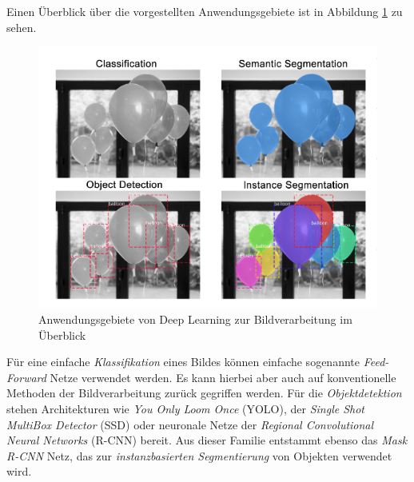 Einen Überblick über die vorgestellten Anwendungsgebiete ist in Abbildung \ref{applications} zu sehen.

\begin{figure}[ht]
	\begin{center}
		\includegraphics[width=12cm]{Bilder/applications.png} 
		\caption[Anwendungsgebiete von Deep Learning zur Bildverarbeitung im Überblick]{Anwendungsgebiete von Deep Learning zur Bildverarbeitung im Überblick \cite{PriyaDwivedi.20190328}}
		\label{applications}
	\end{center}
\end{figure}

Für eine einfache \textit{Klassifikation} eines Bildes können einfache sogenannte \textit{Feed-Forward} Netze verwendet werden. Es kann hierbei aber auch auf konventionelle Methoden der Bildverarbeitung zurück gegriffen werden. Für die \textit{Objektdetektion} stehen Architekturen wie \textit{You Only Loom Once} (YOLO), der \textit{Single Shot MultiBox Detector} (SSD) oder neuronale Netze der \textit{Regional Convolutional Neural Networks} (R-CNN) bereit. Aus dieser Familie entstammt ebenso das \textit{Mask R-CNN} Netz, das zur \textit{instanzbasierten Segmentierung} von Objekten verwendet wird.
